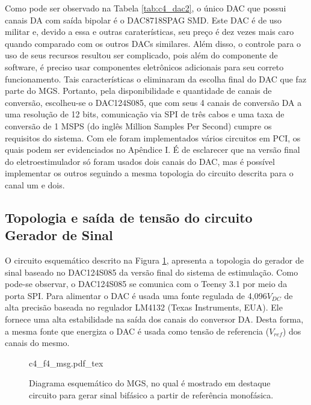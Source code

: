 Como pode ser observado na Tabela \ref{tab:c4_dac2}, o único \acrshort{DAC} que possui canais DA com saída bipolar é o DAC8718SPAG \acrshort{SMD}. Este \acrshort{DAC} é de uso militar e, devido a essa e outras caraterísticas, seu preço é dez vezes mais caro quando comparado com os outros \acrshort{DAC}s similares. Além disso, o controle para o uso de seus recursos resultou ser complicado, pois além do componente de software, é preciso usar componentes eletrônicos adicionais para seu correto funcionamento. Tais características o eliminaram da escolha final do \acrshort{DAC} que faz parte do \acrshort{MGS}. Portanto, pela disponibilidade e quantidade de canais de conversão, escolheu-se o DAC124S085, que com seus 4 canais de conversão \acrshort{DA} a uma resolução de 12 bits, comunicação via \acrshort{SPI} de três cabos e uma taxa de conversão de 1 \acrshort{MSPS} (do inglês Million Samples Per Second) cumpre os requisitos do sistema. Com ele foram implementados vários circuitos em \acrshort{PCI}, os quais podem ser evidenciados no Apêndice I.  É de esclarecer que na versão final do eletroestimulador só foram usados dois canais do \acrshort{DAC}, mas é possível implementar os outros seguindo a mesma topologia do circuito descrita para o canal um e dois.

\subsection*{Topologia e saída de tensão do circuito Gerador de Sinal}
O circuito esquemático descrito na Figura \ref{fig:c4_f4_msg}, apresenta a topologia do gerador de sinal baseado no DAC124S085 da versão final do sistema de estimulação. Como pode-se observar, o DAC124S085 se comunica com o Teensy 3.1 por meio da porta \acrshort{SPI}. Para alimentar o \acrshort{DAC} é usada uma fonte regulada de 4,096$V_{DC}$ de alta precisão baseada no regulador LM4132 (Texas Instruments, EUA). Ele fornece uma alta estabilidade na saída dos canais do conversor \acrshort{DA}. Desta forma, a mesma fonte que energiza o \acrshort{DAC} é usada como tensão de referencia ($V_{ref}$) dos canais do mesmo.


\begin{figure}[h]
    \centering %
    \tiny %
    \def\svgwidth{1\columnwidth}%
    {c4_f4_msg.pdf_tex}
    \caption{Diagrama esquemático do \acrshort{MGS}, no qual é mostrado em destaque circuito para gerar sinal bifásico a partir de referência monofásica.}
    \label{fig:c4_f4_msg}
\end{figure}

